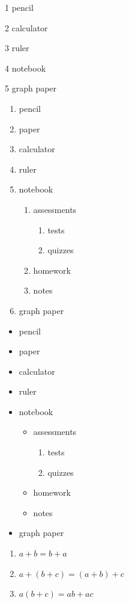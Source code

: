 \documentclass[11pt]{article}
\begin{document}
1 pencil

2 calculator

3 ruler

4 notebook

5 graph paper


\begin{enumerate}
\item pencil
\item paper
\item calculator
\item ruler
\item notebook
	\begin{enumerate}
	\item assessments
		\begin{enumerate}
		\item tests
		\item quizzes
		\end{enumerate}
	\item homework
	\item notes
	\end{enumerate}
\item graph paper
\end{enumerate}


\begin{itemize}
\item pencil
\item paper
\item calculator
\item ruler
\item notebook
	\begin{itemize}
	\item assessments
		\begin{enumerate}
		\item tests
		\item quizzes
		\end{enumerate}
	\item homework
	\item notes
	\end{itemize}
\item graph paper
\end{itemize}


\begin{enumerate}
\item[Commutative] $a+b=b+a$
\item[Associative] $a+(b+c)=(a+b)+c$
\item[Distributive] $a(b+c)=ab+ac$
\end{enumerate}
\end{document}
